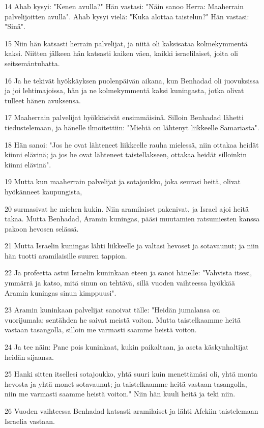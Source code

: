 \par 14 Ahab kysyi: "Kenen avulla?" Hän vastasi: "Näin sanoo Herra: Maaherrain palvelijoitten avulla". Ahab kysyi vielä: "Kuka alottaa taistelun?" Hän vastasi: "Sinä".
\par 15 Niin hän katsasti herrain palvelijat, ja niitä oli kaksisataa kolmekymmentä kaksi. Niitten jälkeen hän katsasti kaiken väen, kaikki israelilaiset, joita oli seitsemäntuhatta.
\par 16 Ja he tekivät hyökkäyksen puolenpäivän aikana, kun Benhadad oli juovuksissa ja joi lehtimajoissa, hän ja ne kolmekymmentä kaksi kuningasta, jotka olivat tulleet hänen avuksensa.
\par 17 Maaherrain palvelijat hyökkäsivät ensimmäisinä. Silloin Benhadad lähetti tiedustelemaan, ja hänelle ilmoitettiin: "Miehiä on lähtenyt liikkeelle Samariasta".
\par 18 Hän sanoi: "Jos he ovat lähteneet liikkeelle rauha mielessä, niin ottakaa heidät kiinni elävinä; ja jos he ovat lähteneet taistellakseen, ottakaa heidät silloinkin kiinni elävinä".
\par 19 Mutta kun maaherrain palvelijat ja sotajoukko, joka seurasi heitä, olivat hyökänneet kaupungista,
\par 20 surmasivat he miehen kukin. Niin aramilaiset pakenivat, ja Israel ajoi heitä takaa. Mutta Benhadad, Aramin kuningas, pääsi muutamien ratsumiesten kanssa pakoon hevosen selässä.
\par 21 Mutta Israelin kuningas lähti liikkeelle ja valtasi hevoset ja sotavaunut; ja niin hän tuotti aramilaisille suuren tappion.
\par 22 Ja profeetta astui Israelin kuninkaan eteen ja sanoi hänelle: "Vahvista itsesi, ymmärrä ja katso, mitä sinun on tehtävä, sillä vuoden vaihteessa hyökkää Aramin kuningas sinun kimppuusi".
\par 23 Aramin kuninkaan palvelijat sanoivat tälle: "Heidän jumalansa on vuorijumala; sentähden he saivat meistä voiton. Mutta taistelkaamme heitä vastaan tasangolla, silloin me varmasti saamme heistä voiton.
\par 24 Ja tee näin: Pane pois kuninkaat, kukin paikaltaan, ja aseta käskynhaltijat heidän sijaansa.
\par 25 Hanki sitten itsellesi sotajoukko, yhtä suuri kuin menettämäsi oli, yhtä monta hevosta ja yhtä monet sotavaunut; ja taistelkaamme heitä vastaan tasangolla, niin me varmasti saamme heistä voiton." Niin hän kuuli heitä ja teki niin.
\par 26 Vuoden vaihteessa Benhadad katsasti aramilaiset ja lähti Afekiin taistelemaan Israelia vastaan.
